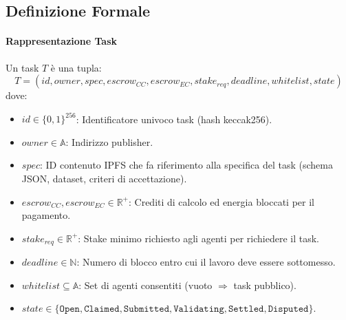 \documentclass[11pt]{article}
\begin{document}
\begin{itemize}[noitemsep]
\subsection{Definizione Formale}
\paragraph{Rappresentazione Task} Un task $T$ è una tupla:
\begin{equation}
T = (id, owner, spec, escrow_{CC}, escrow_{EC}, stake_{req}, deadline, whitelist, state)
\end{equation}
dove:
\begin{itemize}[noitemsep]
  \item $id \in \{0,1\}^{256}$: Identificatore univoco task (hash keccak256).
  \item $owner \in \mathbb{A}$: Indirizzo publisher.
  \item $spec$: ID contenuto IPFS che fa riferimento alla specifica del task (schema JSON, dataset, criteri di accettazione).
  \item $escrow_{CC}, escrow_{EC} \in \mathbb{R}^+$: Crediti di calcolo ed energia bloccati per il pagamento.
  \item $stake_{req} \in \mathbb{R}^+$: Stake minimo richiesto agli agenti per richiedere il task.
  \item $deadline \in \mathbb{N}$: Numero di blocco entro cui il lavoro deve essere sottomesso.
  \item $whitelist \subseteq \mathbb{A}$: Set di agenti consentiti (vuoto $\Rightarrow$ task pubblico).
  \item $state \in \{\texttt{Open}, \texttt{Claimed}, \texttt{Submitted}, \texttt{Validating}, \texttt{Settled}, \texttt{Disputed}\}$.
\end{itemize}


\end{itemize}
\end{document}
